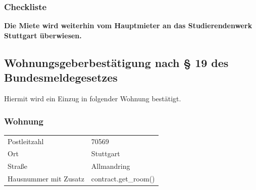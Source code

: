 \documentclass[9pt,pdftex,a4paper]{article}
\begin{document}
{{{{{{{{\subsubsection*{Checkliste}
\bigskip

{\color{red}\textbf{Die Miete wird weiterhin vom Hauptmieter an das Studierendenwerk Stuttgart überwiesen.}}


%
%

\newpage

\subsection*{Wohnungsgeberbestätigung nach § 19 des Bundesmeldegesetzes}

Hiermit wird ein Einzug in folgender Wohnung bestätigt.

\subsubsection*{Wohnung}
\begin{tabularx}{\textwidth}{XX}
Postleitzahl &  70569\\
Ort &  Stuttgart\\
Straße & Allmandring\\
Hausnummer mit Zusatz & {{ contract.get_room() }}\\
\end{tabularx}\bigskip

}}}}}}}}
\end{document}
